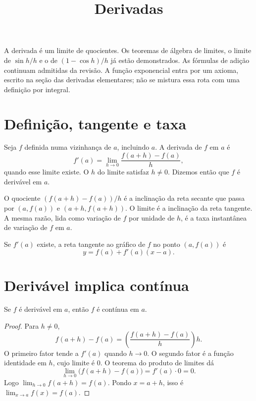 \documentclass[11pt,a4paper]{article}
\title{Derivadas}
\author{}
\date{}
\begin{document}
\maketitle
\tableofcontents

A derivada \'e um limite de quocientes. Os teoremas de \'algebra de limites, o limite de $\sin h/h$ e o de $(1-\cos h)/h$ j\'a est\~ao demonstrados. As f\'ormulas de adi\c{c}\~ao continuam admitidas da revis\~ao. A fun\c{c}\~ao exponencial entra por um axioma, escrito na se\c{c}\~ao das derivadas elementares; n\~ao se mistura essa rota com uma defini\c{c}\~ao por integral.

\section{Defini\c{c}\~ao, tangente e taxa}
\label{sec:def-der}

\begin{definicao}
\label{def:derivada}
Seja $f$ definida numa vizinhan\c{c}a de $a$, incluindo $a$. A derivada de $f$ em $a$ \'e
\[
f'(a)=\lim_{h\to 0}\frac{f(a+h)-f(a)}{h},
\]
quando esse limite existe. O $h$ do limite satisfaz $h\neq 0$. Dizemos ent\~ao que $f$ \'e deriv\'avel em $a$.
\end{definicao}

O quociente $(f(a+h)-f(a))/h$ \'e a inclina\c{c}\~ao da reta secante que passa por $(a,f(a))$ e $(a+h,f(a+h))$. O limite \'e a inclina\c{c}\~ao da reta tangente. A mesma raz\~ao, lida como varia\c{c}\~ao de $f$ por unidade de $h$, \'e a taxa instant\^anea de varia\c{c}\~ao de $f$ em $a$.

\begin{definicao}
Se $f'(a)$ existe, a reta tangente ao gr\'afico de $f$ no ponto $(a,f(a))$ \'e
\[
y=f(a)+f'(a)(x-a).
\]
\end{definicao}


\section{Deriv\'avel implica cont\'inua}
\label{sec:impl}

\begin{teorema}
\label{teo:der-cont}
Se $f$ \'e deriv\'avel em $a$, ent\~ao $f$ \'e cont\'inua em $a$.
\end{teorema}

\begin{proof}
Para $h\neq 0$,
\[
f(a+h)-f(a)=\left(\frac{f(a+h)-f(a)}{h}\right) h.
\]
O primeiro fator tende a $f'(a)$ quando $h\to 0$. O segundo fator \'e a fun\c{c}\~ao identidade em $h$, cujo limite \'e $0$. O teorema do produto de limites d\'a
\[
\lim_{h\to 0}\bigl(f(a+h)-f(a)\bigr)=f'(a)\cdot 0=0.
\]
Logo $\lim_{h\to 0}f(a+h)=f(a)$. Pondo $x=a+h$, isso \'e $\lim_{x\to a}f(x)=f(a)$.
\end{proof}
\end{document}
